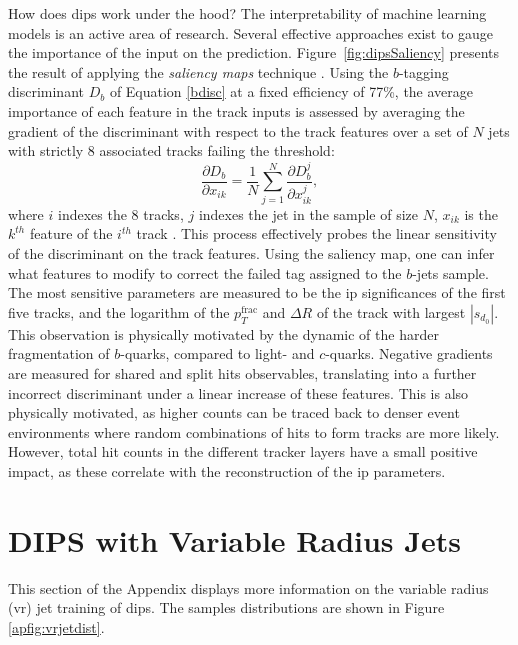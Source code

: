 How does \gls{dips} work under the hood? The interpretability of machine learning models is an active area of research. Several effective approaches exist to gauge the importance of the input on the prediction. Figure~\ref{fig:dipsSaliency} presents the result of applying the \textit{saliency maps} technique \cite{Simonyan2013DeepIC}. Using the $b$-tagging discriminant $D_b$ of Equation \ref{bdisc} at a fixed efficiency of 77\%, the average importance of each feature in the track inputs is assessed by averaging the gradient of the discriminant with respect to the track features over a set of $N$ jets with strictly 8 associated tracks failing the threshold:
\begin{equation}
  \frac{\partial D_b}{\partial x_{ik}} = \frac{1}{N} \sum_{j=1}^N \frac{\partial D_b^{j}}{\partial x_{ik}^{j}},
\end{equation} 
where $i$ indexes the 8 tracks, $j$ indexes the jet in the sample of size $N$, $x_{ik}$ is the $k^{th}$ feature of the $i^{th}$ track \cite{ATL-PHYS-PUB-2020-014}. This process effectively probes the linear sensitivity of the discriminant on the track features. Using the saliency map, one can infer what features to modify to correct the failed tag assigned to the $b$-jets sample. The most sensitive parameters are measured to be the \gls{ip} significances of the first five tracks, and the logarithm of the $p_T^{\textrm{frac}}$ and $\Delta R$ of the track with largest $|s_{d_0}|$. This observation is physically motivated by the dynamic of the harder fragmentation of $b$-quarks, compared to light- and $c$-quarks. Negative gradients are measured for shared and split hits observables, translating into a further incorrect discriminant under a linear increase of these features. This is also physically motivated, as higher counts can be traced back to denser event environments where random combinations of hits to form tracks are more likely. However, total hit counts in the different tracker layers have a small positive impact, as these correlate with the reconstruction of the \gls{ip} parameters.

\section{DIPS with Variable Radius Jets}\label{ap-DIPSVR}
This section of the Appendix displays more information on the variable radius (\gls{vr}) jet training of \gls{dips}. The samples distributions are shown in Figure \ref{apfig:vrjetdist}.

